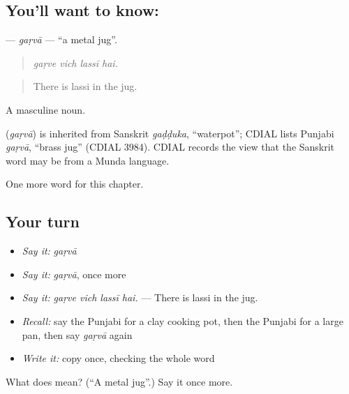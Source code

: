 \subsection*{You'll want to know: }
\textbf{} — \emph{gaṛvā} — \textquotedblleft{}a metal jug\textquotedblright{}.

\begin{quote}
   
\end{quote}

\begin{quote}
\emph{gaṛve vich lassī hai.}
\end{quote}

\begin{quote}
There is lassi in the jug.
\end{quote}

A masculine noun.

\begin{cousinweb}
\textbf{} (\emph{gaṛvā}) is inherited from Sanskrit \emph{gaḍḍuka}, \textquotedblleft{}waterpot\textquotedblright{}; CDIAL lists Punjabi \emph{gaṛvā}, \textquotedblleft{}brass jug\textquotedblright{} (CDIAL 3984). CDIAL records the view that the Sanskrit word may be from a Munda language.
\end{cousinweb}

\begin{grammarlens}[title={What you've built}]
One more word for this chapter.
\end{grammarlens}

\subsection*{Your turn}
\begin{itemize}
\raggedright
  \item \emph{Say it:} \emph{gaṛvā}
  \item \emph{Say it:} \emph{gaṛvā}, once more
  \item \emph{Say it:} \emph{gaṛve vich lassī hai.} — There is lassi in the jug.
  \item \emph{Recall:} say the Punjabi for a clay cooking pot, then the Punjabi for a large pan, then say \emph{gaṛvā} again
  \item \emph{Write it:} copy \textbf{} once, checking the whole word
\end{itemize}

\begin{tcolorbox}[breakable,colback=teal!4,colframe=teal!35!black,title={Before you move on}]
What does  mean? (\textquotedblleft{}A metal jug\textquotedblright{}.) Say it once more.
\end{tcolorbox}

